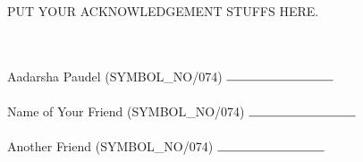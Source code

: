 PUT YOUR ACKNOWLEDGEMENT STUFFS HERE.

\\
\\
\noindent
Aadarsha Paudel (SYMBOL_NO/074)         $\rule{3cm}{0.15mm}$ \\
\\
Name of Your Friend (SYMBOL_NO/074)         $\rule{3cm}{0.15mm}$ \\
\\
Another Friend (SYMBOL_NO/074)         $\rule{3cm}{0.15mm}$ \\
\\
